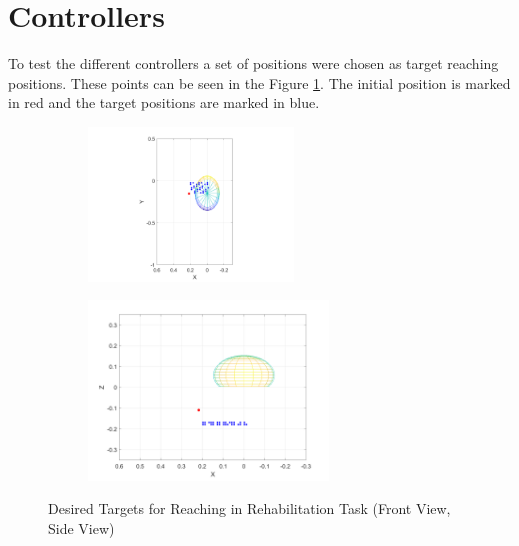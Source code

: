 \section{Controllers}
To test the different controllers a set of positions were chosen as target reaching positions. These points can be seen in the Figure \ref{fig:desiredpoints}. The initial position is marked in red and the target positions are marked in blue.

\begin{figure}[h!] 
    \centering
    \begin{subfigure}[b]{0.45\linewidth}
        \centering

        \includegraphics[width=0.6\textwidth]{Pictures/Results/Controller/DesiredPointsFV.png}
    \end{subfigure}
    \hfill
    \begin{subfigure}[b]{0.45\linewidth}       
        \centering

        \includegraphics[width=0.7\textwidth]{Pictures/Results/Controller/DesiredPointsSV.png}
    \end{subfigure}
    \caption{Desired Targets for Reaching in Rehabilitation Task (Front View, Side View)}
    \label{fig:desiredpoints}
\end{figure}

